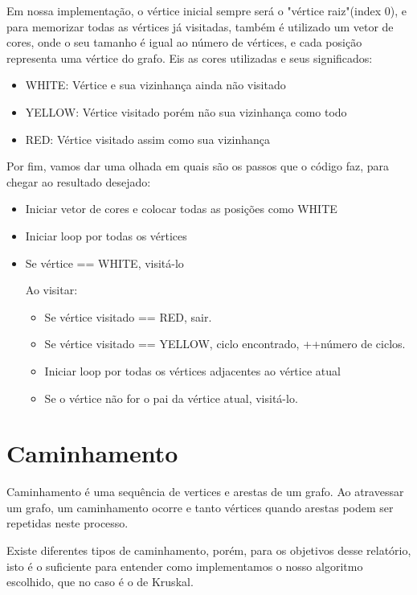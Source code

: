 \documentclass[12pt]{article}
\begin{document}
    Em nossa implementação, o vértice inicial sempre será o "vértice raiz"(index 0), 
    e para memorizar todas as vértices já visitadas, também é utilizado um vetor de cores,
    onde o seu tamanho é igual ao número de vértices, e cada posição representa uma vértice do 
    grafo. Eis as cores utilizadas e seus significados:

    \begin{itemize}
      \item WHITE: Vértice e sua vizinhança ainda não visitado 
      \item YELLOW: Vértice visitado porém não sua vizinhança como todo
      \item RED: Vértice visitado assim como sua vizinhança
    \end{itemize}

    Por fim, vamos dar uma olhada em quais são os passos que o código 
    faz, para chegar ao resultado desejado:

    \begin{itemize}
      \item Iniciar vetor de cores e colocar todas as posições como WHITE
      \item Iniciar loop por todas os vértices 
      \item Se vértice == WHITE, visitá-lo
      
      Ao visitar:
      \begin{itemize}
        \item Se vértice visitado == RED, sair.
        \item Se vértice visitado == YELLOW, ciclo encontrado, ++número de ciclos.
        \item Iniciar loop por todas os vértices adjacentes ao vértice atual 
        \item Se o vértice não for o pai da vértice atual, visitá-lo.
      \end{itemize}
    \end{itemize}

  \section{Caminhamento} \label{sec:walking}

  Caminhamento é uma sequência de vertices e arestas de um grafo. Ao atravessar um grafo,
  um caminhamento ocorre e tanto vértices quando arestas podem ser repetidas neste processo.

  Existe diferentes tipos de caminhamento, porém, para os objetivos desse relatório, isto 
  é o suficiente para entender como implementamos o nosso algoritmo escolhido, que no caso 
  é o de Kruskal.
\end{document}

